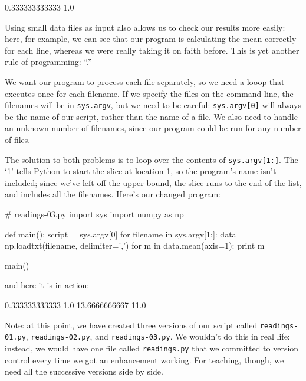 \documentclass{book}
\begin{document}
\begin{VerbOut}
0.333333333333
1.0
\end{VerbOut}

Using small data files as input also allows us to check our results more
easily: here, for example, we can see that our program is calculating
the mean correctly for each line, whereas we were really taking it on
faith before. This is yet another rule of programming:
``.''

We want our program to process each file separately, so we need a looop
that executes once for each filename. If we specify the files on the
command line, the filenames will be in \texttt{sys.argv}, but we need to
be careful: \texttt{sys.argv{[}0{]}} will always be the name of our
script, rather than the name of a file. We also need to handle an
unknown number of filenames, since our program could be run for any
number of files.

The solution to both problems is to loop over the contents of
\texttt{sys.argv{[}1:{]}}. The `1' tells Python to start the slice at
location 1, so the program's name isn't included; since we've left off
the upper bound, the slice runs to the end of the list, and includes all
the filenames. Here's our changed program:

\begin{VerbIn}
# readings-03.py
import sys
import numpy as np

def main():
    script = sys.argv[0]
    for filename in sys.argv[1:]:
        data = np.loadtxt(filename, delimiter=',')
        for m in data.mean(axis=1):
            print m

main()
\end{VerbIn}

and here it is in action:


\begin{VerbOut}
0.333333333333
1.0
13.6666666667
11.0
\end{VerbOut}

Note: at this point, we have created three versions of our script called
\texttt{readings-01.py}, \texttt{readings-02.py}, and
\texttt{readings-03.py}. We wouldn't do this in real life: instead, we
would have one file called \texttt{readings.py} that we committed to
version control every time we got an enhancement working. For teaching,
though, we need all the successive versions side by side.
\end{document}
